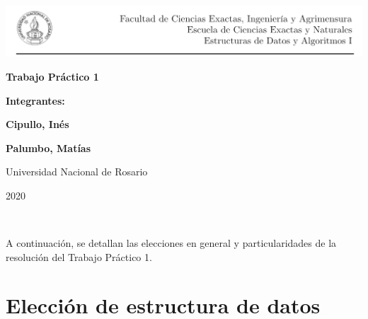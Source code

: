\documentclass[12pt, a4paper, twoside]{article}
\begin{document}
\begin{titlepage}
    \hspace{-1.2cm}\includegraphics[scale= 0.8]{header2}
    \begin{center}
        \vfill
        \vfill
            \vspace{0.7cm}
            \noindent\textbf{\Huge Trabajo Práctico 1}\par
            \vspace{.5cm}
        \vfill
        \noindent \textbf{\huge Integrantes:}\par
        \vspace{.5cm}
        \noindent \textbf{\Large Cipullo, Inés}\par
        \noindent \textbf{\Large Palumbo, Matías}\par
        
 
        \vfill
        \large Universidad Nacional de Rosario \par
        \noindent\large 2020
             
    \end{center}
 \end{titlepage}
 \ \par
\noindent A continuación, se detallan las elecciones en general y particularidades de la resolución del Trabajo Práctico 1.\par

\section{Elección de estructura de datos}
\end{document}
